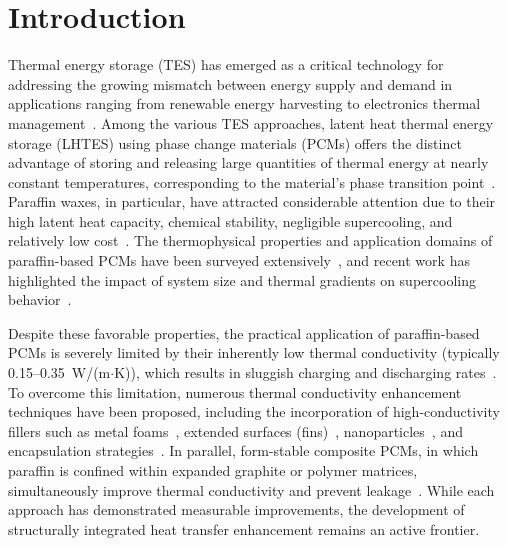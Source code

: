 \section{Introduction}
\label{sec:introduction}

Thermal energy storage (TES) has emerged as a critical technology for addressing the growing mismatch between energy supply and demand in applications ranging from renewable energy harvesting to electronics thermal management~\cite{mehrpooya2026phase,tyagi2012phase,mckenna2021thermal}. Among the various TES approaches, latent heat thermal energy storage (LHTES) using phase change materials (PCMs) offers the distinct advantage of storing and releasing large quantities of thermal energy at nearly constant temperatures, corresponding to the material's phase transition point~\cite{sait2022solidification,belusko2018direct}. Paraffin waxes, in particular, have attracted considerable attention due to their high latent heat capacity, chemical stability, negligible supercooling, and relatively low cost~\cite{bharathiraja2024thermal,bharathiraja2023studies,lin2014thermal,abhat1983low}. The thermophysical properties and application domains of paraffin-based PCMs have been surveyed extensively~\cite{veerakumar2016phase}, and recent work has highlighted the impact of system size and thermal gradients on supercooling behavior~\cite{lilley2020impact}.

Despite these favorable properties, the practical application of paraffin-based PCMs is severely limited by their inherently low thermal conductivity (typically 0.15--0.35~W/(m$\cdot$K)), which results in sluggish charging and discharging rates~\cite{sciacovelli2012melting,amin2014effective}. To overcome this limitation, numerous thermal conductivity enhancement techniques have been proposed, including the incorporation of high-conductivity fillers such as metal foams~\cite{ghalambaz2020conjugate,parida2020effect,liu2024pore}, extended surfaces (fins)~\cite{patel2018thermal,temel2023experimental,altinok2026asymmetric,uniyal2024melting}, nanoparticles~\cite{murugan2017thermal,bashirpour2021investigation,bora2026enhanced}, and encapsulation strategies~\cite{solomon2016exergy,alkayiem2012thermal,sulzgruber2021micro}. In parallel, form-stable composite PCMs, in which paraffin is confined within expanded graphite or polymer matrices, simultaneously improve thermal conductivity and prevent leakage~\cite{sari2007thermal,li2013nano,xia2010preparation,zhang2006study,zhai2017preparation,zuo2020enhanced,guler2026engineered,zhang2025sulfur,sari2004form}. While each approach has demonstrated measurable improvements, the development of structurally integrated heat transfer enhancement remains an active frontier.

